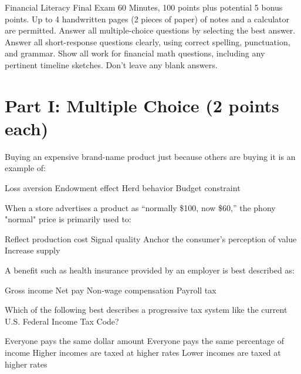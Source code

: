 \documentclass[12pt]{exam}
\begin{document}
\FontEasyRead

\Heading
{Financial Literacy}
{Final Exam}
{60 Minutes, 100 points plus potential 5 bonus points.
  Up to 4 handwritten pages (2 pieces of paper) of notes and a calculator are permitted.
  Answer all multiple-choice questions by selecting the best answer.
  Answer all short-response questions clearly, using correct spelling, punctuation, and grammar.
  Show all work for financial math questions, including any pertinent timeline sketches.
Don't leave any blank answers.}

\section*{Part I: Multiple Choice (2 points each)}

\begin{questions}

  \begin{mcquestion}[2]
    Buying an expensive brand-name product just because others are buying it is an example of:
    \begin{choices}
      \choice Loss aversion
      \choice Endowment effect
      \CorrectChoice Herd behavior
      \choice Budget constraint
    \end{choices}
  \end{mcquestion}

  \begin{mcquestion}[2]
    When a store advertises a product as “normally \$100, now \$60,” the phony "normal" price is
    primarily used to:
    \begin{choices}
      \choice Reflect production cost
      \choice Signal quality
      \CorrectChoice Anchor the consumer’s perception of value
      \choice Increase supply
    \end{choices}
  \end{mcquestion}

  \begin{mcquestion}[2]
    A benefit such as health insurance provided by an employer is best described as:
    \begin{choices}
      \choice Gross income
      \choice Net pay
      \CorrectChoice Non-wage compensation
      \choice Payroll tax
    \end{choices}
  \end{mcquestion}

  \begin{mcquestion}[2]
    Which of the following best describes a progressive tax system like the
    current U.S. Federal Income Tax Code?
    \begin{choices}
      \choice Everyone pays the same dollar amount
      \choice Everyone pays the same percentage of income
      \CorrectChoice Higher incomes are taxed at higher rates
      \choice Lower incomes are taxed at higher rates
    \end{choices}
  \end{mcquestion}


\end{questions}
\end{document}
